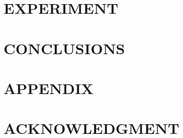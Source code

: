 \documentclass[letterpaper, 10 pt, conference]{ieeeconf}  %
\begin{document}
\section{EXPERIMENT}

\section{CONCLUSIONS}










\section*{APPENDIX}

\section*{ACKNOWLEDGMENT}




\end{document}
